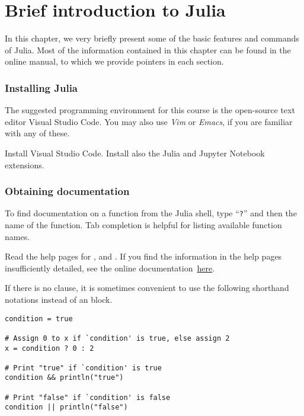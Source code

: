 \appendix
\chapter{Brief introduction to Julia}%
\label{cha:a_very_short_introduction_to_julia}

In this chapter,
we very briefly present  some of the basic features and commands of Julia.
Most of the information contained in this chapter can be found in the online manual,
to which we provide pointers in each section.

\subsection*{Installing Julia}%
\label{sub:installing_julia}
The suggested programming environment for this course is the open-source text editor Visual Studio Code.
You may also use \emph{Vim} or \emph{Emacs},
if you are familiar with any of these.

\begin{task}
    Install Visual Studio Code.
    Install also the Julia and Jupyter Notebook extensions.
\end{task}

\subsection*{Obtaining documentation}%
\label{sub:getting_documentation}

To find documentation on a function from the Julia shell,
type ``\texttt{?}'' and then the name of the function.
Tab completion is helpful for listing available function names.

\begin{task}
    Read the help pages for ,  and .
    If you find the information in the help pages insufficiently detailed,
    see the online documentation~\href{https://docs.julialang.org/en/v1/manual/control-flow/} {here}.
\end{task}


\begin{remark}
If there is no  clause,
it is sometimes convenient to use the following shorthand notations instead of an  block.
\begin{verbatim}
condition = true

# Assign 0 to x if `condition' is true, else assign 2
x = condition ? 0 : 2

# Print "true" if `condition' is true
condition && println("true")

# Print "false" if `condition' is false
condition || println("false")
\end{verbatim}
\end{remark}

